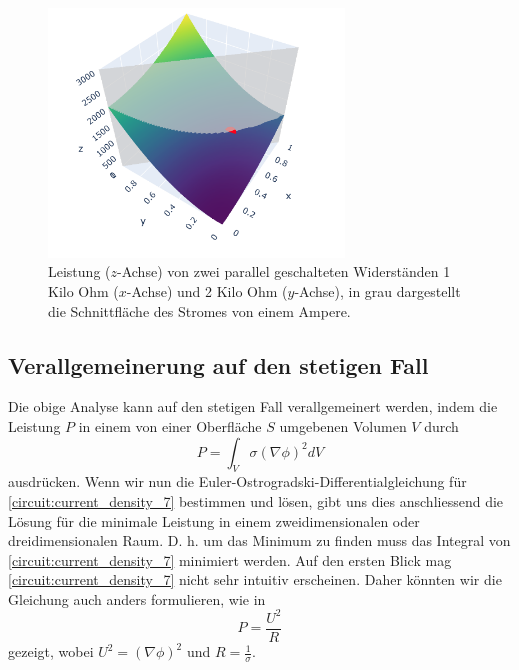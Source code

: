 \begin{figure}
	\centering
	\includegraphics[width=0.7\textwidth]{papers/circuit/two_parrallel_resistors.png}
	\caption{Leistung ($z$-Achse) von zwei parallel geschalteten Widerständen 1 Kilo Ohm ($x$-Achse) und 2 Kilo Ohm ($y$-Achse), in grau dargestellt die Schnittfläche des Stromes von einem Ampere.}
	\label{fig:circuit_power}
\end{figure}

\subsection{Verallgemeinerung auf den stetigen Fall}
Die obige Analyse kann auf den stetigen Fall verallgemeinert werden, indem die Leistung $P$ in einem von einer Oberfläche $S$ umgebenen Volumen $V$ durch 
\begin{equation}
	P=\int_V \sigma(\nabla \phi)^2 d V
	\label{circuit:current_density_7}
\end{equation}
ausdrücken. Wenn wir nun die Euler-Ostrogradski-Differentialgleichung für \eqref{circuit:current_density_7} bestimmen und lösen, gibt uns dies anschliessend die Lösung für die minimale Leistung in einem zweidimensionalen oder dreidimensionalen Raum. D. h. um das Minimum zu finden muss das Integral von \eqref{circuit:current_density_7} minimiert werden. Auf den ersten Blick mag \eqref{circuit:current_density_7} nicht sehr intuitiv erscheinen. Daher könnten wir die Gleichung auch anders formulieren, wie in 
\begin{equation}
	P=\frac{U^2}{R}
	\label{circuit:current_density_8}
\end{equation}
gezeigt, wobei $U^2=\left( \nabla \phi \right)^2$ und $R=\frac{1}{\sigma}$.





